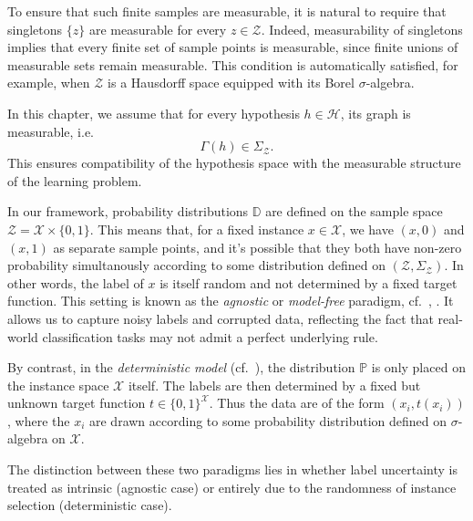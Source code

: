 To ensure that such finite samples are measurable, it is natural to require that singletons $\{z\}$ are measurable for every $z \in \mathcal{Z}$.
Indeed, measurability of singletons implies that every finite set of sample points is measurable, since finite unions of measurable sets remain measurable.
This condition is automatically satisfied, for example, when $\mathcal{Z}$ is a Hausdorff space equipped with its Borel $\sigma$-algebra.

\begin{remark}
    In this chapter, we assume that for every hypothesis $h \in \mathcal{H}$, its graph is measurable, i.e.
    \[
        \Gamma(h) \in \Sigma_{\mathcal{Z}}.
    \]
    This ensures compatibility of the hypothesis space with the measurable structure of the learning problem.
\end{remark}

\begin{remark}
    In our framework, probability distributions $\mathbb{D}$ are defined on the sample space $\mathcal{Z} = \mathcal{X}\times\{0,1\}$.
    This means that, for a fixed instance $x \in \mathcal{X}$, we have $(x,0)$ and $(x,1)$ as separate sample points, and it's possible that they both have non-zero probability simultanously according to some distribution defined on $(\mathcal{Z}, \Sigma_{\mathcal{Z}})$.
    In other words, the label of $x$ is itself random and not determined by a fixed target function.
    This setting is known as the \emph{agnostic} or \emph{model-free} paradigm, cf.~\cite[§3.2.1]{ShalevShwartzBenDavid2014}, \cite[§3.3]{AnthonyBartlett2009}.
    It allows us to capture noisy labels and corrupted data, reflecting the fact that real-world classification tasks may not admit a perfect underlying rule.

    By contrast, in the \emph{deterministic model} (cf.~\cite{BlumerEhrenfeuchtHausslerWarmuth1989}), the distribution $\mathbb{P}$ is only placed on the instance space $\mathcal{X}$ itself.
    The labels are then determined by a fixed but unknown target function $t \in \{0,1\}^\mathcal{X}$.
    Thus the data are of the form $(x_i,t(x_i))$, where the $x_i$ are drawn according to some probability distribution defined on $\sigma$-algebra on $\mathcal{X}$.

    The distinction between these two paradigms lies in whether label uncertainty is treated as intrinsic (agnostic case) or entirely due to the randomness of instance selection (deterministic case).
\end{remark}

